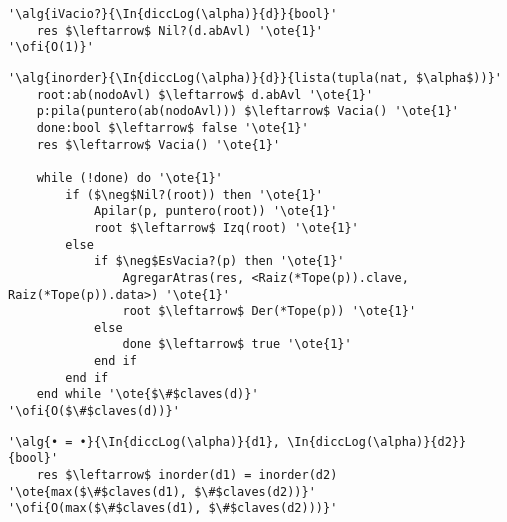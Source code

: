\begin{lstlisting}[mathescape]
'\alg{iVacio?}{\In{diccLog(\alpha)}{d}}{bool}'
	res $\leftarrow$ Nil?(d.abAvl) '\ote{1}'
'\ofi{O(1)}'
\end{lstlisting}

\begin{lstlisting}[mathescape]
'\alg{inorder}{\In{diccLog(\alpha)}{d}}{lista(tupla(nat, $\alpha$))}'
	root:ab(nodoAvl) $\leftarrow$ d.abAvl '\ote{1}'
	p:pila(puntero(ab(nodoAvl))) $\leftarrow$ Vacia() '\ote{1}'
	done:bool $\leftarrow$ false '\ote{1}'
	res $\leftarrow$ Vacia() '\ote{1}'

	while (!done) do '\ote{1}'
		if ($\neg$Nil?(root)) then '\ote{1}'
			Apilar(p, puntero(root)) '\ote{1}'
			root $\leftarrow$ Izq(root) '\ote{1}'
		else
			if $\neg$EsVacia?(p) then '\ote{1}'
				AgregarAtras(res, <Raiz(*Tope(p)).clave, Raiz(*Tope(p)).data>) '\ote{1}'
				root $\leftarrow$ Der(*Tope(p)) '\ote{1}'
			else
				done $\leftarrow$ true '\ote{1}'
			end if
		end if
	end while '\ote{$\#$claves(d)}'
'\ofi{O($\#$claves(d))}'
\end{lstlisting}

\begin{lstlisting}[mathescape]
'\alg{• = •}{\In{diccLog(\alpha)}{d1}, \In{diccLog(\alpha)}{d2}}{bool}'
	res $\leftarrow$ inorder(d1) = inorder(d2) '\ote{max($\#$claves(d1), $\#$claves(d2))}'
'\ofi{O(max($\#$claves(d1), $\#$claves(d2)))}'
\end{lstlisting}
